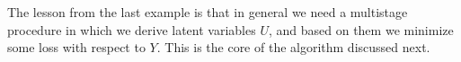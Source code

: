 The lesson from the last example is that in general we need a
multistage procedure in which we derive latent variables $U$, and
based on them we minimize some loss with respect to $Y$. This is the
core of the algorithm discussed next.






